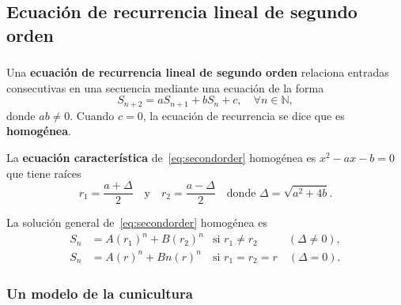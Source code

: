 \subsection{Ecuación de recurrencia lineal de segundo orden}

\begin{frame}
\frametitle{\subsecname}

\begin{definition}
	Una \textbf{ecuación de recurrencia lineal de segundo orden} relaciona entradas consecutivas en una secuencia mediante una ecuación de la forma
	\begin{equation}\label{eq:secondorder}
	S_{n+2}=aS_{n+1}+bS_{n}+c,\quad\forall n\in\mathds{N},
	\end{equation}
	donde $ab\neq0$. Cuando $c=0$, la ecuación de recurrencia se dice que es \textbf{homogénea}.
\end{definition}

\begin{definition}
	La \textbf{ecuación característica} de~\eqref{eq:secondorder} homogénea es $x^{2}-ax-b=0$ que tiene raíces \[ r_{1}=\frac{a+\Delta}{2}\quad\text{y}\quad r_{2}=\frac{a-\Delta}{2}\quad\text{donde }\Delta=\sqrt{a^{2}+4b}. \]
\end{definition}

\begin{theorem}
	La solución general de~\eqref{eq:secondorder} homogénea es
	\begin{align*}
	S_{n}&=A{\left(r_{1}\right)}^{n}+B{\left(r_{2}\right)}^{n}&\text{si }r_{1}\neq r_{2}\phantom{r_{2}r_{2}}\quad\left(\Delta\neq0\right),\\
	S_{n}&=A{\left(r\right)}^{n}+Bn{\left(r\right)}^{n}&\text{si }r_{1}=r_{2}=r\quad\left(\Delta=0\right).
	\end{align*}
\end{theorem}


\end{frame}

\subsubsection{Un modelo de la cunicultura}

